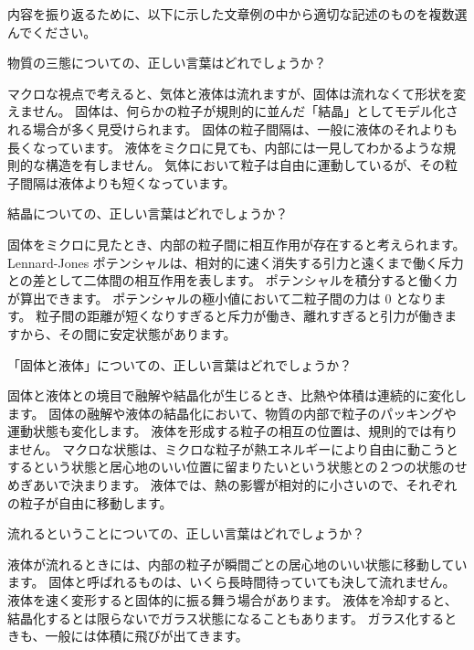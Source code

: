 \documentclass[uplatex,dvipdfmx,a4paper,11pt]{jsarticle}
\begin{document}
内容を振り返るために、以下に示した文章例の中から適切な記述のものを複数選んでください。
\begin{qlist}
	\qitem 物質の三態についての、正しい言葉はどれでしょうか？
		\begin{qlist2}
			\qitem マクロな視点で考えると、気体と液体は流れますが、固体は流れなくて形状を変えません。
			\qitem 固体は、何らかの粒子が規則的に並んだ「結晶」としてモデル化される場合が多く見受けられます。
			\qitem 固体の粒子間隔は、一般に液体のそれよりも長くなっています。
			\qitem 液体をミクロに見ても、内部には一見してわかるような規則的な構造を有しません。
			\qitem 気体において粒子は自由に運動しているが、その粒子間隔は液体よりも短くなっています。
		\end{qlist2}
	
	\qitem 結晶についての、正しい言葉はどれでしょうか？
		\begin{qlist2}
			\qitem 固体をミクロに見たとき、内部の粒子間に相互作用が存在すると考えられます。
			\qitem Lennard-Jones ポテンシャルは、相対的に速く消失する引力と遠くまで働く斥力との差として二体間の相互作用を表します。
			\qitem ポテンシャルを積分すると働く力が算出できます。
			\qitem ポテンシャルの極小値において二粒子間の力は 0 となります。
			\qitem 粒子間の距離が短くなりすぎると斥力が働き、離れすぎると引力が働きますから、その間に安定状態があります。
		\end{qlist2}

	\qitem 「固体と液体」についての、正しい言葉はどれでしょうか？
		\begin{qlist2}
			\qitem 固体と液体との境目で融解や結晶化が生じるとき、比熱や体積は連続的に変化します。
			\qitem 固体の融解や液体の結晶化において、物質の内部で粒子のパッキングや運動状態も変化します。
			\qitem 液体を形成する粒子の相互の位置は、規則的では有りません。
			\qitem マクロな状態は、ミクロな粒子が熱エネルギーにより自由に動こうとするという状態と居心地のいい位置に留まりたいという状態との２つの状態のせめぎあいで決まります。
			\qitem 液体では、熱の影響が相対的に小さいので、それぞれの粒子が自由に移動します。
		\end{qlist2}	
	
	\qitem 流れるということについての、正しい言葉はどれでしょうか？
		\begin{qlist2}
			\qitem 液体が流れるときには、内部の粒子が瞬間ごとの居心地のいい状態に移動しています。
			\qitem 固体と呼ばれるものは、いくら長時間待っていても決して流れません。
			\qitem 液体を速く変形すると固体的に振る舞う場合があります。
			\qitem 液体を冷却すると、結晶化するとは限らないでガラス状態になることもあります。
			\qitem ガラス化するときも、一般には体積に飛びが出てきます。
		\end{qlist2}	


\end{qlist}
\end{document}
